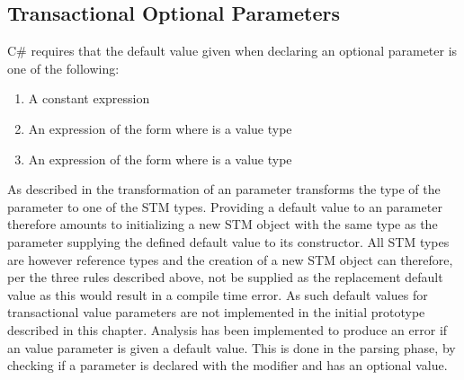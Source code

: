 \subsection{Transactional Optional Parameters}
C\# requires that the default value given when declaring an optional parameter is one of the following\cite[p. 309]{csharp2013specificaiton}:
\begin{enumerate}
	\item A constant expression
	\item An expression of the form  where  is a value type
	\item An expression of the form  where  is a value type
\end{enumerate}
As described in  the transformation of an  parameter transforms the type of the parameter to one of the \ac{STM} types. Providing a default value to an  parameter therefore amounts to initializing a new \ac{STM} object with the same type as the parameter supplying the defined default value to its constructor. All \ac{STM} types are however reference types and the creation of a new \ac{STM} object can therefore, per the three rules described above, not be supplied as the replacement default value as this would result in a compile time error. As such default values for transactional value parameters are not implemented in the initial prototype described in this chapter. Analysis has been implemented to produce an error if an  value parameter is given a default value. This is done in the parsing phase, by checking if a parameter is declared with the  modifier and has an optional value.



